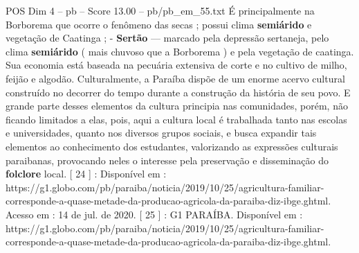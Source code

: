 \begin{textsample}{POS Dim 4 – pb – Score 13.00 – pb/pb\_em\_55.txt}
É principalmente na Borborema que ocorre o fenômeno das secas ; possui clima \textbf{semiárido} e vegetação de Caatinga ; - \textbf{Sertão} — marcado pela depressão sertaneja, pelo clima \textbf{semiárido} ( mais chuvoso que a Borborema ) e pela vegetação de caatinga.
Sua economia está baseada na pecuária extensiva de corte e no cultivo de milho, feijão e algodão.
Culturalmente, a Paraíba dispõe de um enorme acervo cultural construído no decorrer do tempo durante a construção da história de seu povo.
E grande parte desses elementos da cultura principia nas comunidades, porém, não ficando limitados a elas, pois, aqui a cultura local é trabalhada tanto nas escolas e universidades, quanto nos diversos grupos sociais, e busca expandir tais elementos ao conhecimento dos estudantes, valorizando as expressões culturais paraibanas, provocando neles o interesse pela preservação e disseminação do \textbf{folclore} local. [ 24 ] : Disponível em : https://g1.globo.com/pb/paraiba/noticia/2019/10/25/agricultura-familiar-corresponde-a-quase-metade-da-producao-agricola-da-paraiba-diz-ibge.ghtml.
Acesso em : 14 de jul. de 2020. [ 25 ] : G1 PARAÍBA.
Disponível em : https://g1.globo.com/pb/paraiba/noticia/2019/10/25/agricultura-familiar-corresponde-a-quase-metade-da-producao-agricola-da-paraiba-diz-ibge.ghtml.

\end{textsample}
